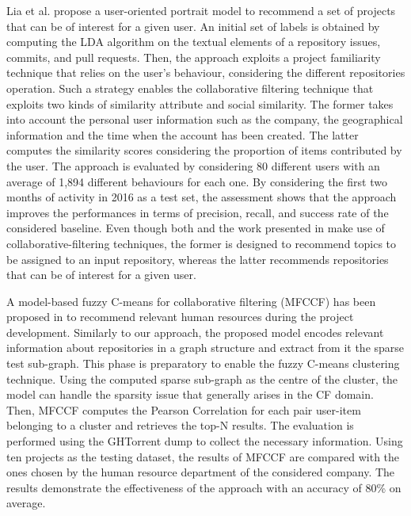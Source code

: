Lia et al. \cite{liao_user_2018} propose a user-oriented portrait model to 
recommend a set of \GH projects that can be of interest for a given user. An 
initial set of labels is obtained by computing the LDA algorithm on the textual 
elements of a repository \ie issues, commits, and pull requests. Then, the 
approach exploits a project familiarity technique that relies on the user's 
behaviour, considering the different repositories operation. Such a strategy 
enables the collaborative filtering technique that exploits two kinds of 
similarity \ie attribute and social similarity. The former takes into account 
the personal user information such as the company, the geographical information 
and the time when the account has been created. The latter computes the 
similarity scores considering the proportion of items contributed by the user. 
The approach is evaluated by considering 80 different users with an average of 
1,894 different behaviours for each one. By considering the first two months of 
activity in 2016 as a test set, the assessment shows that the approach improves 
the performances in terms of precision, recall, and success rate of the 
considered baseline. Even though both \TF and the work presented in 
\cite{liao_user_2018} make use of collaborative-filtering techniques, the 
former is designed to recommend topics to be assigned to an input \GH 
repository, whereas the latter recommends \GH repositories that can be of 
interest for a given user.


A model-based fuzzy C-means for collaborative filtering (MFCCF) has been 
proposed in \cite{ajoudanian_recommending_2019} to recommend relevant human 
resources during the \GH project development. Similarly to our approach, the 
proposed model encodes relevant information about repositories in a graph 
structure and extract from it the sparse test sub-graph. This phase is 
preparatory to enable the fuzzy C-means clustering technique. Using the 
computed sparse sub-graph as the centre of the cluster, the model can handle 
the sparsity issue that generally arises in the CF domain. Then, MFCCF computes 
the Pearson Correlation for each pair user-item belonging to a cluster and 
retrieves the top-N results. The evaluation is performed using the GHTorrent 
dump to collect the necessary information. Using ten projects as the testing 
dataset, the results of MFCCF are compared with the ones chosen by the human 
resource department of the considered company. The results demonstrate the 
effectiveness of the approach with an accuracy of 80\% on average. 

